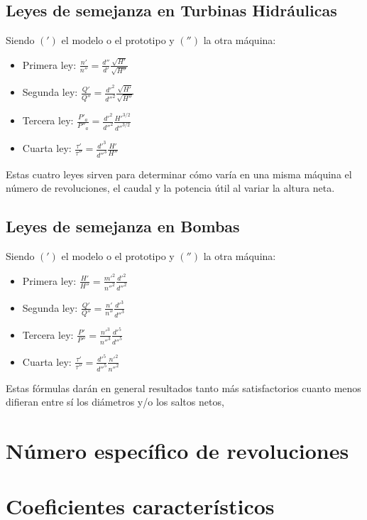 \subsection{Leyes de semejanza en Turbinas Hidráulicas}
Siendo $(')$ el modelo o el prototipo y $('')$ la otra máquina:
\begin{itemize}
    \item Primera ley: $\frac{n'}{n''} = \frac{d''}{d'} \frac{\sqrt{H'}}{\sqrt{H''}}$
    \item Segunda ley: $\frac{Q'}{Q''} = \frac{d'^2}{d''^2} \frac{\sqrt{H'}}{\sqrt{H''}}$
    \item Tercera ley: $\frac{P'_a}{P''_a} = \frac{d'^2}{d''^2} \frac{H'^{3/2}}{d''^{3/2}}$
    \item Cuarta ley: $\frac{\tau'}{\tau''} = \frac{d'^3}{d''^3} \frac{H'}{H''}$
\end{itemize}
Estas cuatro leyes sirven para determinar cómo varía en una misma máquina el número de revoluciones, el caudal y la potencia útil al variar la altura neta.

\subsection{Leyes de semejanza en Bombas}
Siendo $(')$ el modelo o el prototipo y $('')$ la otra máquina:
\begin{itemize}
    \item Primera ley: $\frac{H'}{H''} = \frac{m'^2}{n''^2} \frac{d'^2}{d''^2}$
    \item Segunda ley: $\frac{Q'}{Q''} = \frac{n'}{n''} \frac{d'^3}{d''^3}$
    \item Tercera ley: $\frac{P'}{P''} =  \frac{n'^3}{n''^3} \frac{d'^5}{d''^5}$
    \item Cuarta ley: $\frac{\tau'}{\tau''} = \frac{d'^5}{d''^5} \frac{n'^2}{n''^2}$
\end{itemize}

Estas fórmulas darán en general resultados tanto más satisfactorios cuanto menos difieran entre sí los diámetros y/o los saltos netos, 

\section{Número específico de revoluciones}

\section{Coeficientes característicos}
